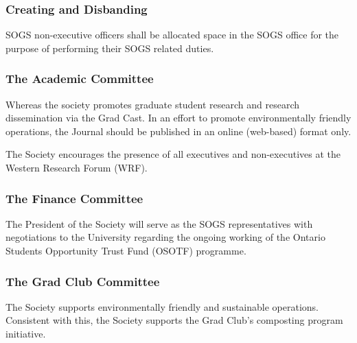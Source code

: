 \subsubsection{Creating and Disbanding}
\begin{longenum}[ label*=\thesubsubsection.\arabic*., align=left]
\item 	SOGS non-executive officers shall be allocated space in the SOGS office for the purpose of performing their SOGS related duties.  
\end{longenum}



\subsubsection{The Academic Committee}
\begin{longenum}[ label*=\thesubsubsection.\arabic*., align=left]
\item 		Whereas the society promotes graduate student research and research dissemination via the Grad Cast. In an effort to promote environmentally friendly operations, the Journal should be published in an online (web-based) format only. 
\item  	The Society encourages the presence of all executives and non-executives at the Western Research Forum (WRF).
\end{longenum}


\subsubsection{The Finance Committee}
\begin{longenum}[ label*=\thesubsubsection.\arabic*., align=left]
\item 	The President of the Society will serve as the SOGS representatives with negotiations to the University regarding the ongoing working of the Ontario Students Opportunity Trust Fund (OSOTF) programme.   
\end{longenum}


\subsubsection{The Grad Club Committee}
\begin{longenum}[ label*=\thesubsubsection.\arabic*., align=left]
\item 	The Society supports environmentally friendly and sustainable operations. Consistent with this, the Society supports the Grad Club's composting program initiative.    
\end{longenum}

